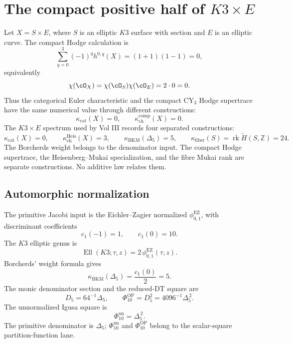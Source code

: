 \providecommand{\kch}{\kappa_{\mathrm{ch}}}
\providecommand{\kcat}{\kappa_{\mathrm{cat}}}
\providecommand{\kBKM}{\kappa_{\mathrm{BKM}}}
\providecommand{\kfib}{\kappa_{\mathrm{fiber}}}
\providecommand{\kHeis}{\kappa_{\mathrm{ch}}^{\mathrm{Heis}}}
\providecommand{\Muk}{\mathrm{Muk}}
\providecommand{\Heis}{\mathrm{Heis}}
\providecommand{\Ypos}{Y^{+}}
\providecommand{\Dfive}{D_{5}}
\providecommand{\Delfive}{\Delta_{5}}
\providecommand{\Phiun}{\Phi_{10}^{\mathrm{un}}}
\providecommand{\PhiOP}{\Phi_{10}^{\mathrm{OP}}}
\providecommand{\Tot}{\operatorname{Tot}}
\providecommand{\CoHA}{\operatorname{CoHA}}
\providecommand{\Ran}{\operatorname{Ran}}
\providecommand{\Etwo}{E_{2}}
\providecommand{\Eone}{E_{1}}

\section*{The compact positive half of \(K3\times E\)}
\label{sec:k3e-positive-half-gluing}

Let \(X=S\times E\), where \(S\) is an elliptic \(K3\) surface with
section and \(E\) is an elliptic curve.  The compact Hodge calculation is
\[
  \sum_{q=0}^{3}(-1)^q h^{0,q}(X)
  =
  (1+1)(1-1)=0,
\]
equivalently
\[
  \chi(\cO_X)=\chi(\cO_S)\chi(\cO_E)=2\cdot 0=0.
\]
Thus the categorical Euler characteristic and the compact
CY$_3$ Hodge supertrace have the same numerical value through different
constructions:
\[
  \kcat(X)=0,\qquad \kch^{\mathrm{comp}}(X)=0.
\]
The \(K3\times E\) spectrum used by Vol III records four separated
constructions:
\[
  \kcat(X)=0,\qquad
  \kHeis(X)=3,\qquad
  \kBKM(\Delfive)=5,\qquad
  \kfib(S)=\operatorname{rk}\widetilde H(S,\mathbb Z)=24.
\]
The Borcherds weight belongs to the denominator input. The compact
Hodge supertrace, the Heisenberg--Mukai specialization, and the fibre
Mukai rank are separate constructions.  No additive law relates them.

\subsection*{Automorphic normalization}

The primitive Jacobi input is the Eichler--Zagier normalized
\(\phi_{0,1}^{\mathrm{EZ}}\), with discriminant coefficients
\[
  c_1(-1)=1,\qquad c_1(0)=10.
\]
The \(K3\) elliptic genus is
\[
  \operatorname{Ell}(K3;\tau,z)=2\,\phi_{0,1}^{\mathrm{EZ}}(\tau,z).
\]
Borcherds' weight formula gives
\[
  \kBKM(\Delfive)=\frac{c_1(0)}{2}=5.
\]
The monic denominator section and the reduced-DT square are
\[
  \Dfive=64^{-1}\Delfive,\qquad
  \PhiOP=\Dfive^2=4096^{-1}\Delfive^{\,2}.
\]
The unnormalized Igusa square is
\[
  \Phiun=\Delfive^{\,2}.
\]
The primitive denominator is \(\Delfive\); \(\Phiun\) and \(\PhiOP\)
belong to the scalar-square partition-function lane.

